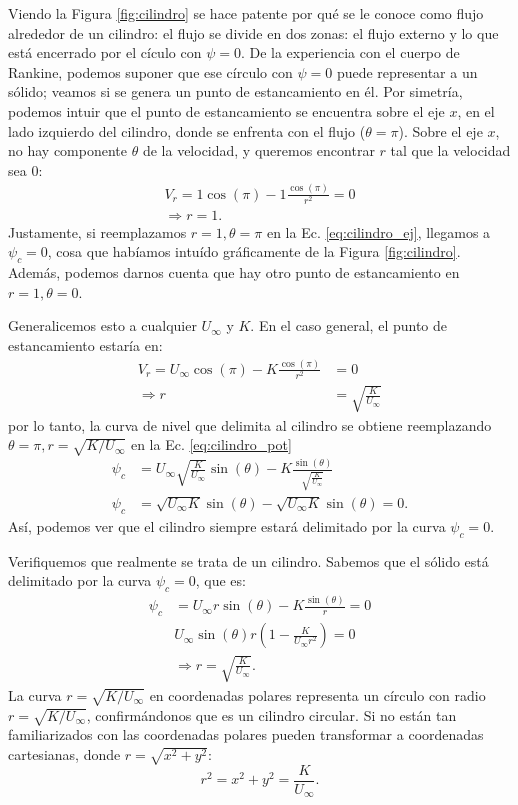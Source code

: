 Viendo la Figura \ref{fig:cilindro} se hace patente por qué se le conoce como flujo alrededor de un cilindro: el flujo se divide en dos zonas: el flujo externo y lo que está encerrado por el cículo con $\psi=0$.
De la experiencia con el cuerpo de Rankine, podemos suponer que ese círculo con $\psi=0$ puede representar a un sólido; veamos si se genera un punto de estancamiento en él.
Por simetría, podemos intuir que el punto de estancamiento se encuentra sobre el eje $x$, en el lado izquierdo del cilindro, donde se enfrenta con el flujo ($\theta=\pi$).
Sobre el eje $x$, no hay componente $\theta$ de la velocidad, y queremos encontrar $r$ tal que la velocidad sea $0$:
%
\begin{align}
V_r = 1\cos(\pi) - 1\frac{\cos(\pi)}{r^2} =0 \nonumber\\
\Rightarrow r = 1.
\end{align}
%
Justamente, si reemplazamos $r=1, \theta=\pi$ en la Ec. \eqref{eq:cilindro_ej}, llegamos a $\psi_c=0$, cosa que habíamos intuído gráficamente de la Figura \ref{fig:cilindro}.
Además, podemos darnos cuenta que hay otro punto de estancamiento en $r=1, \theta=0$. 

Generalicemos esto a cualquier $U_\infty$ y $K$.
En el caso general, el punto de estancamiento estaría en:
%
\begin{align}
V_r = U_\infty\cos(\pi) - K\frac{\cos(\pi)}{r^2} &=0 \nonumber\\
\Rightarrow r &= \sqrt{\frac{K}{U_\infty}}
\end{align}
%
por lo tanto, la curva de nivel que delimita al cilindro se obtiene reemplazando $\theta=\pi,r=\sqrt{K/U_\infty}$ en la Ec. \eqref{eq:cilindro_pot}
%
\begin{align}
\psi_c &= U_\infty \sqrt{\frac{K}{U_\infty}}\sin(\theta) - K\frac{\sin(\theta)}{\sqrt{\frac{K}{U_\infty}}}\nonumber\\
\psi_c&=\sqrt{U_\infty K}\sin(\theta)-\sqrt{U_\infty K}\sin(\theta)=0.
\end{align}
%
Así, podemos ver que el cilindro siempre estará delimitado por la curva $\psi_c=0$.

Verifiquemos que realmente se trata de un cilindro.
Sabemos que el sólido está delimitado por la curva $\psi_c=0$, que es:
%
\begin{align}
\psi_c &= U_\infty r\sin(\theta) - K\frac{\sin(\theta)}{r} = 0\nonumber\\
&U_\infty\sin(\theta)r\left(1-\frac{K}{U_\infty r^2}\right) = 0\nonumber\\
&\Rightarrow r=\sqrt{\frac{K}{U_\infty}}.
\end{align}
%
La curva $r=\sqrt{K/U_\infty}$ en coordenadas polares representa un círculo con radio $r=\sqrt{K/U_\infty}$, confirmándonos que es un cilindro circular.
Si no están tan familiarizados con las coordenadas polares pueden transformar a coordenadas cartesianas, donde $r=\sqrt{x^2+y^2}$:
%
\begin{equation}
r^2=x^2+y^2=\frac{K}{U_\infty}.
\end{equation}

